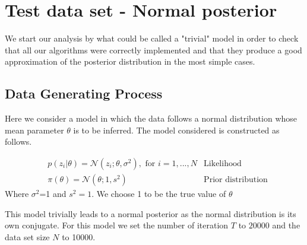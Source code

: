 \documentclass[11pt,a4paper]{report}\usepackage[]{graphicx}\usepackage[]{color}
\begin{document}
\section{Test data set - Normal posterior}
\label{DGP0}
We start our analysis by what could be called a "trivial" model in order to check that all our algorithms were correctly implemented and that they produce a good approximation of the posterior distribution in the most simple cases.

\subsection{Data Generating Process}
Here we consider a model in which the data follows a normal distribution whose mean parameter $\theta$ is to be inferred.
The model considered is constructed as follows. 

\begin{align}
\label{eq:3}
&p(z_i|\theta)=\mathcal N(z_i;\theta,\sigma^2),\text{ for $i=1,...,N$}&\text{Likelihood}\\
\label{eq:4}
&\pi(\theta)=\mathcal N(\theta;1,s^2)&\text{Prior distribution}
\end{align}
Where $\sigma^2$=1 and $s^2=1$. We choose 1 to be the true value of $\theta$

This model trivially leads to a normal posterior as the normal distribution is its own conjugate.
For this model we set the number of iteration $T$ to $20000$ and the data set size $N$ to 10000.
\end{document}
